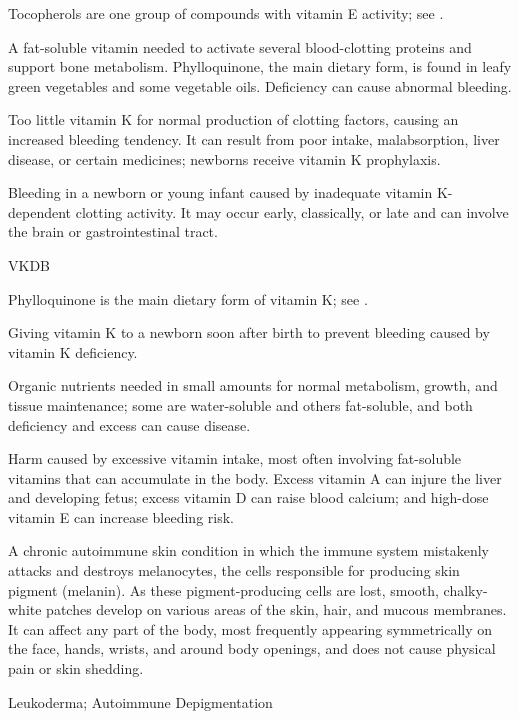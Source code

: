  Tocopherols are one group of compounds with vitamin E activity; see .

 A fat-soluble vitamin needed to activate several blood-clotting proteins and support bone metabolism. Phylloquinone, the main dietary form, is found in leafy green vegetables and some vegetable oils. Deficiency can cause abnormal bleeding.

 Too little vitamin K for normal production of clotting factors, causing an increased bleeding tendency. It can result from poor intake, malabsorption, liver disease, or certain medicines; newborns receive vitamin K prophylaxis.

 Bleeding in a newborn or young infant caused by inadequate vitamin K-dependent clotting activity. It may occur early, classically, or late and can involve the brain or gastrointestinal tract.

\synonyms
VKDB

 Phylloquinone is the main dietary form of vitamin K; see .

 Giving vitamin K to a newborn soon after birth to prevent bleeding caused by vitamin K deficiency.

 Organic nutrients needed in small amounts for normal metabolism, growth, and tissue maintenance; some are water-soluble and others fat-soluble, and both deficiency and excess can cause disease.

 Harm caused by excessive vitamin intake, most often involving fat-soluble vitamins that can accumulate in the body. Excess vitamin A can injure the liver and developing fetus; excess vitamin D can raise blood calcium; and high-dose vitamin E can increase bleeding risk.

 A chronic autoimmune skin condition in which the immune system mistakenly attacks and destroys melanocytes, the cells responsible for producing skin pigment (melanin). As these pigment-producing cells are lost, smooth, chalky-white patches develop on various areas of the skin, hair, and mucous membranes. It can affect any part of the body, most frequently appearing symmetrically on the face, hands, wrists, and around body openings, and does not cause physical pain or skin shedding.

\synonyms
Leukoderma; Autoimmune Depigmentation

